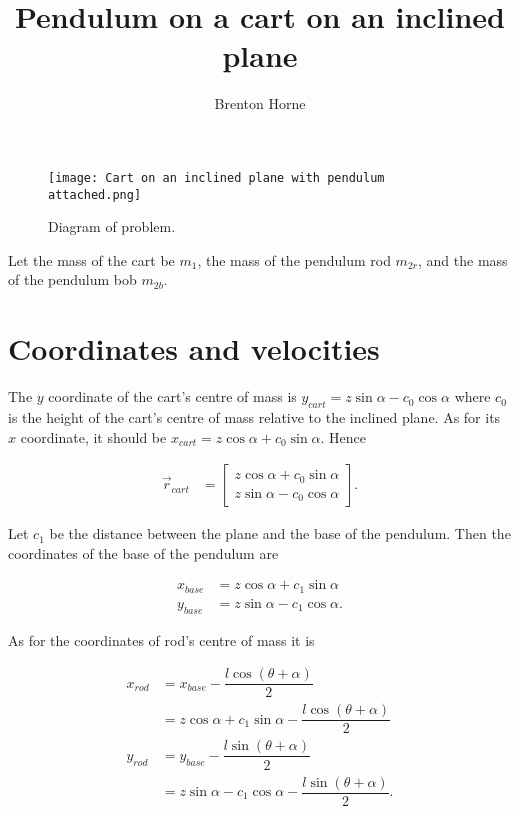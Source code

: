 \documentclass[12pt,a4paper,portrait]{article}
\date{}
\title{Pendulum on a cart on an inclined plane}
\author{Brenton Horne}
\begin{document}
	\maketitle
	\begin{figure}[H]
		\texttt{[image: Cart on an inclined plane with pendulum attached.png]}
		\caption{Diagram of problem.}\label{fig1}
	\end{figure}
	
	Let the mass of the cart be $m_1$, the mass of the pendulum rod $m_{2r}$, and the mass of the pendulum bob $m_{2b}$.
	
	\tableofcontents
	
	\section{Coordinates and velocities}
	The $y$ coordinate of the cart's centre of mass is $y_{cart} = z\sin{\alpha} -c_0\cos{\alpha}$ where $c_0$ is the height of the cart's centre of mass relative to the inclined plane. As for its $x$ coordinate, it should be $x_{cart} = z\cos{\alpha}+c_0\sin{\alpha}$. Hence
	
	\begin{align*}
		\vec{r}_{cart} &= \begin{bmatrix}
			z\cos{\alpha} + c_0\sin{\alpha} \\
			z\sin{\alpha} - c_0\cos{\alpha}
		\end{bmatrix}.
	\end{align*}
	
	Let $c_1$ be the distance between the plane and the base of the pendulum. Then the coordinates of the base of the pendulum are
	
	\begin{align*}
		x_{base} &= z\cos{\alpha} + c_1\sin{\alpha} \\
		y_{base} &= z\sin{\alpha} - c_1\cos{\alpha}.
	\end{align*}
	
	As for the coordinates of rod's centre of mass it is
	
	\begin{align*}
		x_{rod} &= x_{base} - \dfrac{l\cos{(\theta+\alpha)}}{2}\\
		&= z\cos{\alpha} + c_1\sin{\alpha} - \dfrac{l\cos{(\theta+\alpha)}}{2} \\
		y_{rod} &= y_{base} - \dfrac{l\sin{(\theta+\alpha)}}{2}\\
		&= z\sin{\alpha} - c_1\cos{\alpha} - \dfrac{l\sin{(\theta+\alpha)}}{2}.
	\end{align*}
	
\end{document}
